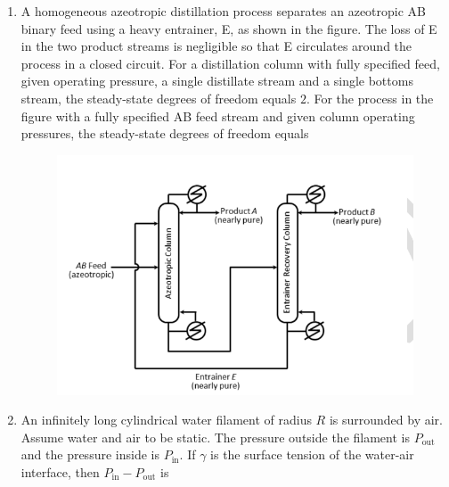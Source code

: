 \documentclass[journal,12pt,onecolumn]{IEEEtran}
\theoremstyle{remark}
\begin{document}
\begin{enumerate}
		\item A homogeneous azeotropic distillation process separates an azeotropic AB binary feed using a heavy entrainer, E, as shown in the figure. The loss of E in the two product streams is negligible so that E circulates around the process in a closed circuit. For a distillation column with fully specified feed, given operating pressure, a single distillate stream and a single bottoms stream, the steady-state degrees of freedom equals $2$. For the process in the figure with a fully specified AB feed stream and given column operating pressures, the steady-state degrees of freedom equals
		\begin{figure}
			\includegraphics[width = 0.8\columnwidth]{q14}
			\caption*{}
			\label{fig:q14}
		\end{figure}
		
		\hfill{}
		\begin{enumerate}
		\end{enumerate}
		
		\item An infinitely long cylindrical water filament of radius $R$ is surrounded by air. Assume water and air to be static. The pressure outside the filament is $P_{\text{out}}$ and the pressure inside is $P_{\text{in}}$. If $\gamma$ is the surface tension of the water-air interface, then $P_{\text{in}} - P_{\text{out}}$ is
		
		\hfill{\brak{\text{GATE CH 2024}}}
		\begin{enumerate}
			\begin{multicols}{4}
				\item $\frac{2\gamma}{R}$
				\item $0$
				\item $\frac{\gamma}{R}$
				\item $\frac{4\gamma}{R}$
			\end{multicols}
		\end{enumerate}
		

\end{enumerate}
\end{document}

